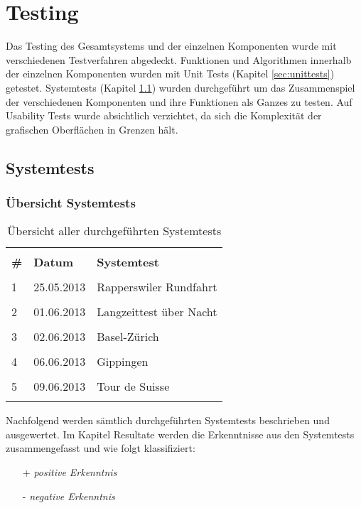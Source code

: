 \section{Testing}
Das Testing des Gesamtsystems und der einzelnen Komponenten wurde mit verschiedenen Testverfahren abgedeckt. Funktionen und Algorithmen innerhalb der einzelnen Komponenten wurden mit Unit Tests (Kapitel \ref{sec:unittests}) getestet. Systemtests (Kapitel \ref{sec:systemtests}) wurden durchgeführt um das Zusammenspiel der verschiedenen Komponenten und ihre Funktionen als Ganzes zu testen. Auf Usability Tests wurde absichtlich verzichtet, da sich die Komplexität der grafischen Oberflächen in Grenzen hält. 

\subsection{Systemtests}
\label{sec:systemtests}

\subsubsection{Übersicht Systemtests}
\begin{longtable}{p{0.3cm}|p{1.8cm}|p{9.3cm}}
& &  \\ [-1.5ex]
\textbf{\#} & \textbf{Datum} & \textbf{Systemtest} \\ [1ex] \hline & &  \\ [-1.5ex]
1 & 25.05.2013 & Rapperswiler Rundfahrt \\ [1ex] \hline & &  \\ [-1.5ex]
2 & 01.06.2013 & Langzeittest über Nacht \\ [1ex] \hline & &  \\ [-1.5ex]
3 & 02.06.2013 & Basel-Zürich \\ [1ex] \hline & &  \\ [-1.5ex]
4 & 06.06.2013 & Gippingen \\ [1ex] \hline & &  \\ [-1.5ex]
5 & 09.06.2013 & Tour de Suisse \\ [1ex]

\caption{Übersicht aller durchgeführten Systemtests}
\end{longtable} 

Nachfolgend werden sämtlich durchgeführten Systemtests beschrieben und ausgewertet. Im Kapitel Resultate werden die Erkenntnisse aus den Systemtests zusammengefasst und wie folgt klassifiziert:
\begin{itemize} [noitemsep,topsep=0pt]
	\item[+] \textit{positive Erkenntnis}
	\item[-] \textit{negative Erkenntnis} 
\end{itemize}


